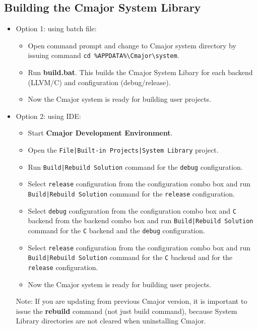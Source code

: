 \documentclass[oneside, a4paper, 11pt]{article}
\begin{document}
\subsection{Building the Cmajor System Library}

\begin{itemize}

\item
Option 1: using batch file:

\begin{itemize}

\item
Open command prompt and change to Cmajor system directory by issuing command
\verb|cd %APPDATA%\Cmajor\system|.

\item
Run \textbf{build.bat}.
This builds the Cmajor System Libary for each backend (LLVM/C) and
configuration (debug/release).

\item
Now the Cmajor system is ready for building user projects.

\end{itemize}

\item
Option 2: using IDE:

\begin{itemize}

\item
Start \textbf{Cmajor Development Environment}.

\item
Open the \verb!File|Built-in Projects|System Library! project.

\item
Run \verb!Build|Rebuild Solution! command for the \verb|debug| configuration.

\item
Select \verb|release| configuration from the configuration combo box
and run\\
\verb!Build|Rebuild Solution! command for the \verb|release| configuration.

\item
Select \verb|debug| configuration from the configuration combo box and
\verb|C| backend from the backend combo box
and run \verb!Build|Rebuild Solution! command for the \verb|C| backend and the \verb|debug| configuration.

\item
Select \verb|release| configuration from the configuration combo box
and run\\
\verb!Build|Rebuild Solution! command for the \verb|C| backend and for the \verb|release| configuration.

\item
Now the Cmajor system is ready for building user projects.

\end{itemize}

Note: If you are updating from previous Cmajor version, it is important to issue the \textbf{rebuild} command
(not just build command), because System Library directories are not cleared when uninstalling Cmajor.

\end{itemize}
\end{document}
